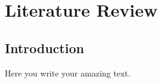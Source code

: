 \chapter{Literature Review}
\label{chp:litrev}


\section{Introduction}

Here you write your amazing text.